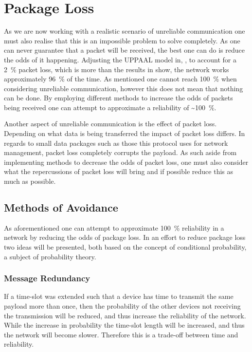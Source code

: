 \section{Package Loss}
As we are now working with a realistic scenario of unreliable communication one must also realise that this is an impossible problem to solve completely.
As one can never guarantee that a packet will be received, the best one can do is reduce the odds of it happening.
Adjusting the UPPAAL model in, , to account for a 2~\% packet loss, which is more than the results in  show, the network works approximately 96~\% of the time.
As mentioned one cannot reach 100~\% when considering unreliable communication, however this does not mean that nothing can be done.
By employing different methods to increase the odds of packets being received one can attempt to approximate a reliability of \textasciitilde100~\%.

Another aspect of unreliable communication is the effect of packet loss.
Depending on what data is being transferred the impact of packet loss differs.
In regards to small data packages such as those this protocol uses for network management, packet loss completely corrupts the payload.
As such aside from implementing methods to decrease the odds of packet loss, one must also consider what the repercussions of packet loss will bring and if possible reduce this as much as possible. 

\subsection{Methods of Avoidance}\label{sub:avoidance}
As aforementioned one can attempt to approximate 100~\% reliability in a network by reducing the odds of package loss.
In an effort to reduce package loss two ideas will be presented, both based on the concept of conditional probability, a subject of probability theory.

\subsubsection*{Message Redundancy}\label{redundancy}
If a time-slot was extended such that a device has time to transmit the same payload more than once, then the probability of the other devices not receiving the transmission will be reduced, and thus increase the reliability of the network.
While the increase in probability the time-slot length will be increased, and thus the network will become slower.
Therefore this is a trade-off between time and reliability. 

